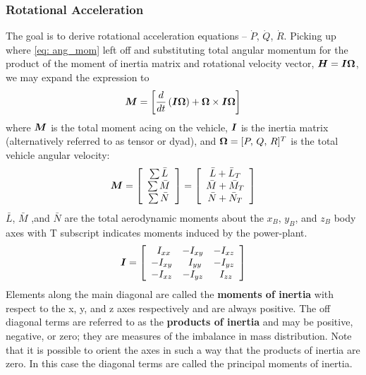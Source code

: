 \documentclass[12pt]{ucthesis}
\begin{document}
\subsubsection{Rotational Acceleration}
\label{subsubsec: rot}
%
The goal is to derive rotational acceleration equations -- $\dot{P}$, $\dot{Q}$, $\dot{R}$. Picking up where \autoref{eq: ang_mom} left off and substituting total angular momentum for the product of the moment of inertia matrix and rotational velocity vector, $\boldsymbol{H} = \boldsymbol{I}\boldsymbol{\Omega}$, we may expand the expression to
%
	\begin{equation}
		\boldsymbol{M} = \left[ \frac{d}{dt} \left( \boldsymbol{I}\boldsymbol{\Omega} \right) + \boldsymbol{\Omega} \times \boldsymbol{I}\boldsymbol{\Omega} \right]
		\label{eq: ang_mom_nasa}
	\end{equation}
%
where $\boldsymbol{M}$ is the total moment acing on the vehicle, $\boldsymbol{I}$ is the inertia matrix (alternatively referred to as tensor or dyad), and $\boldsymbol{\Omega} = [P,\,Q,\,R]^T$ is the total vehicle angular velocity:
	\begin{equation}
		\boldsymbol{M} = \textstyle \left[ \begin{array}{c} \sum \bar{L} \\ \sum \bar{M} \\ \sum \bar{N} \end{array}\right]= \left[ \begin{array}{c} 
		\bar{L} + \bar{L}_T \\
		\bar{M} + \bar{M}_T \\
		\bar{N} + \bar{N}_T 
		\end{array}\right]
		\label{eq: ang_mom_L}
	\end{equation}
%
\indent $\bar{L}$, $\bar{M}$ ,and $\bar{N}$ are the total aerodynamic moments about the $x_B$, $y_B$, and $z_B$ body axes with T subscript indicates moments induced by the power-plant.
%
	\begin{equation}    %
		\vect{I} = \left[\begin{array}{ccc} 
							\,\; I_{xx} & - I_{xy} & - I_{xz} \\
							- I_{xy} & \,\; I_{yy} & - I_{yz} \\
							- I_{xz} & - I_{yz} &  \,\; I_{zz}
						 \end{array}\right]
		\label{eq: ang_mom_I}
	\end{equation}
%
\indent Elements along the main diagonal are called the \textbf{moments of inertia} with respect to the x, y, and z axes respectively and are always positive. The off diagonal terms are referred to as the \textbf{products of inertia} and may be positive, negative, or zero; they are measures of the imbalance in mass distribution. Note that it is possible to orient the axes in such a way that the products of inertia are zero. In this case the diagonal terms are called the principal moments of inertia. 
\end{document}
